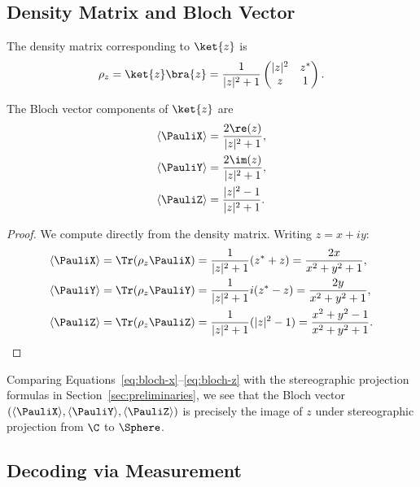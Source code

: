 \subsection{Density Matrix and Bloch Vector}

The density matrix corresponding to $\ket{z}$ is
\begin{equation}
    \label{eq:density-matrix}
    \rho_z = \ket{z}\bra{z} = \frac{1}{|z|^2 + 1}\begin{pmatrix} 
        |z|^2 & z^* \\
        z & 1
    \end{pmatrix}.
\end{equation}

\begin{proposition}
\label{prop:bloch-vector}
The Bloch vector components of $\ket{z}$ are
\begin{align}
    \langle \PauliX \rangle &= \frac{2\re(z)}{|z|^2 + 1}, \label{eq:bloch-x} \\
    \langle \PauliY \rangle &= \frac{2\im(z)}{|z|^2 + 1}, \label{eq:bloch-y} \\
    \langle \PauliZ \rangle &= \frac{|z|^2 - 1}{|z|^2 + 1}. \label{eq:bloch-z}
\end{align}
\end{proposition}

\begin{proof}
We compute directly from the density matrix. Writing $z = x + iy$:
\begin{align}
    \langle \PauliX \rangle &= \Tr(\rho_z \PauliX) = \frac{1}{|z|^2+1}(z^* + z) = \frac{2x}{x^2+y^2+1}, \\
    \langle \PauliY \rangle &= \Tr(\rho_z \PauliY) = \frac{1}{|z|^2+1}i(z^* - z) = \frac{2y}{x^2+y^2+1}, \\
    \langle \PauliZ \rangle &= \Tr(\rho_z \PauliZ) = \frac{1}{|z|^2+1}(|z|^2 - 1) = \frac{x^2+y^2-1}{x^2+y^2+1}.
\end{align}
\end{proof}

\begin{remark}
Comparing Equations~\eqref{eq:bloch-x}--\eqref{eq:bloch-z} with the stereographic projection formulas in Section~\ref{sec:preliminaries}, we see that the Bloch vector $(\langle \PauliX \rangle, \langle \PauliY \rangle, \langle \PauliZ \rangle)$ is precisely the image of $z$ under stereographic projection from $\C$ to $\Sphere$.
\end{remark}

\subsection{Decoding via Measurement}

